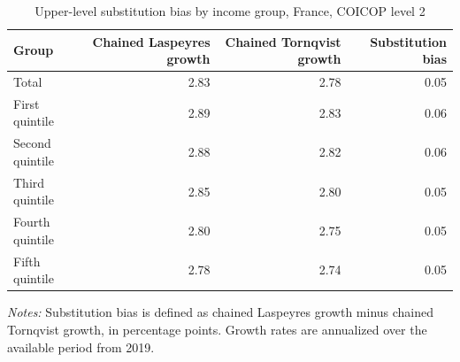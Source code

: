\begin{table}

\caption{\label{tab:fr-substitution-bias}Upper-level substitution bias by income group, France, COICOP level 2}
\centering
\begin{tabular}[t]{lrrr}
\toprule
Group & Chained Laspeyres growth & Chained Tornqvist growth & Substitution bias\\
\midrule
Total & 2.83 & 2.78 & 0.05\\
First quintile & 2.89 & 2.83 & 0.06\\
Second quintile & 2.88 & 2.82 & 0.06\\
Third quintile & 2.85 & 2.80 & 0.05\\
Fourth quintile & 2.80 & 2.75 & 0.05\\
\addlinespace
Fifth quintile & 2.78 & 2.74 & 0.05\\
\bottomrule
\end{tabular}
\end{table}
\begin{flushleft}
\footnotesize{\emph{Notes:} Substitution bias is defined as chained Laspeyres growth minus chained Tornqvist growth, in percentage points. Growth rates are annualized over the available period from 2019.}
\end{flushleft}
